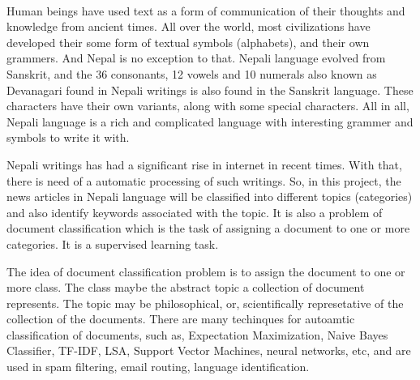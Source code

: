 \documentclass[12pt]{report}
\begin{document}
    \paragraph{}
        Human beings have used text as a form of communication of their thoughts and knowledge from ancient times. All over the world, most civilizations have developed their some form of textual symbols 
        (alphabets), and  their own grammers.
        And Nepal is no exception to that. Nepali language evolved from Sanskrit, and the 36 consonants, 12 vowels and 10 numerals also known as Devanagari found in Nepali writings is also found 
        in the Sanskrit language. 
        These characters have their own variants, along with some special characters. All in all, Nepali language is a rich and complicated language with interesting grammer and symbols to write it with.
        
        Nepali writings has had a significant rise in internet in recent times. With that, there is need of a automatic processing of such writings.          
        So, in this project, the news articles in Nepali language will be classified into different topics (categories) and also identify keywords associated with the topic.
        It is also a problem of document classification which is the task of assigning a document to one or more categories. It is a supervised learning task. 

        The idea of document classification problem is to assign the document to one or more class. The class maybe the abstract topic a collection of document represents. The topic may be philosophical, or, scientifically represetative
        of the collection of the documents. There are many techinques for autoamtic classification of documents, such as, Expectation Maximization, Naive Bayes Classifier, TF-IDF, LSA, Support Vector Machines,
        neural networks, etc, and are used in spam filtering, email routing, language identification\cite{wikipedia2021}. 
        

        
        
        



        

        
\end{document}
